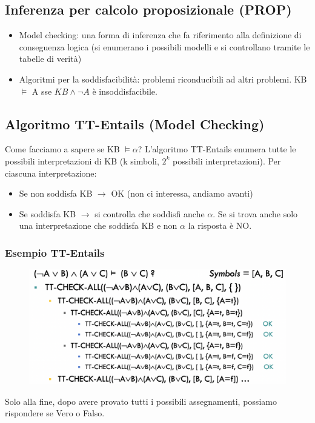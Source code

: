 \documentclass{article}
\begin{document}
\subsection{Inferenza per calcolo proposizionale (PROP)}
\begin{itemize}
    \item Model checking: una forma di inferenza che fa riferimento alla definizione di conseguenza logica (si enumerano i possibili modelli e si controllano tramite le tabelle di verità)
    \item Algoritmi per la soddisfacibilità: problemi riconducibili ad altri problemi. \newline KB $\models$ A sse $KB\land \neg A$ è insoddisfacibile.
\end{itemize}

\subsection{Algoritmo TT-Entails (Model Checking)}
Come facciamo a sapere se KB $\models \alpha$? L'algoritmo TT-Entails enumera tutte le possibili interpretazioni di KB (k simboli, $2^k$ possibili interpretazioni). Per ciascuna interpretazione: 
\begin{itemize}
    \item Se non soddisfa KB $\to$ OK (non ci interessa, andiamo avanti)
    \item Se soddisfa KB $\to$ si controlla che soddisfi anche $\alpha$. \newline 
    Se si trova anche solo una interpretazione che soddisfa KB e non $\alpha$ la risposta è NO.
\end{itemize} 

\subsubsection{Esempio TT-Entails}
\begin{figure}[H]
\centering
\includegraphics[scale=0.37]{Images/ttentailscheck.png}
\end{figure}
Solo alla fine, dopo avere provato tutti i possibili assegnamenti, possiamo rispondere se Vero o Falso.
\end{document}
